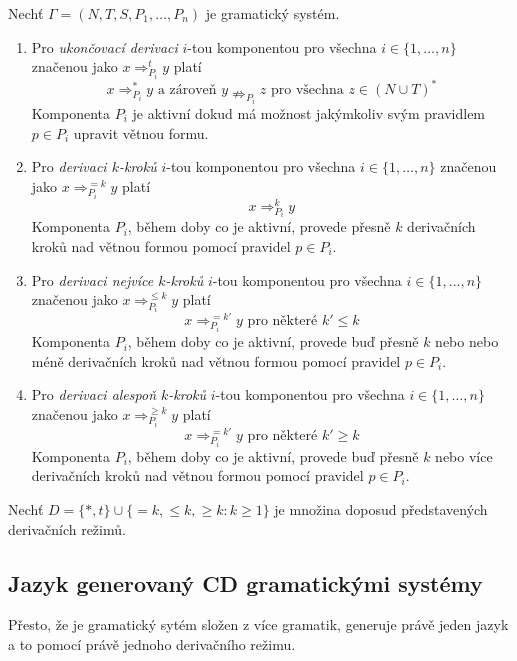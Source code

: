 \begin{definice}
  Nechť $\Gamma = (N, T, S, P_1, \dots, P_n)$ je gramatický systém.
  \begin{enumerate}
    \item Pro \emph{ukončovací derivaci} $i$-tou komponentou pro všechna $i \in \{1, \dots, n\}$ značenou jako $x \Rightarrow_{P_i}^t y$ platí
    $$x \Rightarrow_{P_i}^* y \text{ a zároveň } y \nRightarrow_{P_i} z \text{ pro všechna } z \in (N \cup T)^*$$
    Komponenta $P_i$ je aktivní dokud má možnost jakýmkoliv svým pravidlem $p \in P_i$ upravit větnou formu.
    \item Pro \emph{derivaci $k$-kroků} $i$-tou komponentou pro všechna $i \in \{1, \dots, n\}$ značenou jako $x \Rightarrow_{P_i}^{=k} y$ platí
    $$x \Rightarrow_{P_i}^k y$$
    Komponenta $P_i$, během doby co je aktivní, provede přesně $k$ derivačních kroků nad větnou formou pomocí pravidel $p \in P_i$.
    \item Pro \emph{derivaci nejvíce $k$-kroků} $i$-tou komponentou pro všechna $i \in \{1, \dots, n\}$ značenou jako $x \Rightarrow_{P_i}^{\leq k} y$ platí
    $$x \Rightarrow_{P_i}^{=k'} y \text{ pro některé } k' \leq k$$
    Komponenta $P_i$, během doby co je aktivní, provede buď přesně $k$ nebo nebo méně derivačních kroků nad větnou formou pomocí pravidel $p \in P_i$.
    \item Pro \emph{derivaci alespoň $k$-kroků} $i$-tou komponentou pro všechna $i \in \{1, \dots, n\}$ značenou jako $x \Rightarrow_{P_i}^{\geq k} y$ platí
    $$x \Rightarrow_{P_i}^{=k'} y \text{ pro některé } k' \geq k$$
    Komponenta $P_i$, během doby co je aktivní, provede buď přesně $k$ nebo více derivačních kroků nad větnou formou pomocí pravidel $p \in P_i$.
  \end{enumerate}
\end{definice}

\begin{konvence}
  Nechť $D = \{*, t\} \cup \{=k, \leq k, \geq k\!: k \geq 1\}$ je množina doposud představených derivačních režimů.
\end{konvence}

\subsection*{Jazyk generovaný CD gramatickými systémy}
Přesto, že je gramatický sytém složen z více gramatik, generuje právě jeden jazyk a to pomocí právě jednoho derivačního režimu.

